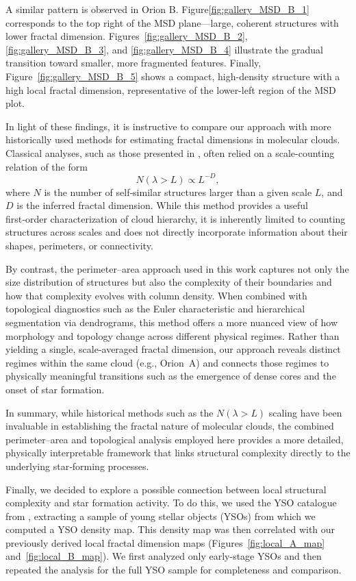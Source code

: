A similar pattern is observed in Orion B.
Figure\ref{fig:gallery_MSD_B_1} corresponds to the top right of the MSD plane—large, coherent structures with lower fractal dimension.
Figures~\ref{fig:gallery_MSD_B_2}, \ref{fig:gallery_MSD_B_3}, and \ref{fig:gallery_MSD_B_4} illustrate the gradual transition toward smaller, more fragmented features.
Finally, Figure~\ref{fig:gallery_MSD_B_5} shows a compact, high-density structure with a high local fractal dimension, representative of the lower-left region of the MSD plot.

In light of these findings, it is instructive to compare our approach with more historically used methods for estimating fractal dimensions in molecular clouds.  
Classical analyses, such as those presented in \cite{elmegreen1996fractal}, often relied on a scale-counting relation of the form
\[
N(\lambda > L) \propto L^{-D},
\]
where \(N\) is the number of self‑similar structures larger than a given scale \(L\), and \(D\) is the inferred fractal dimension.  
While this method provides a useful first‑order characterization of cloud hierarchy, it is inherently limited to counting structures across scales and does not directly incorporate information about their shapes, perimeters, or connectivity.

By contrast, the perimeter–area approach used in this work captures not only the size distribution of structures but also the complexity of their boundaries and how that complexity evolves with column density.  
When combined with topological diagnostics such as the Euler characteristic and hierarchical segmentation via dendrograms, this method offers a more nuanced view of how morphology and topology change across different physical regimes.  
Rather than yielding a single, scale‑averaged fractal dimension, our approach reveals distinct regimes within the same cloud (e.g., Orion~A) and connects those regimes to physically meaningful transitions such as the emergence of dense cores and the onset of star formation.

In summary, while historical methods such as the \( N(\lambda > L) \) scaling have been invaluable in establishing the fractal nature of molecular clouds, the combined perimeter–area and topological analysis employed here provides a more detailed, physically interpretable framework that links structural complexity directly to the underlying star‑forming processes.

Finally, we decided to explore a possible connection between local structural complexity and star formation activity. To do this, we used the YSO catalogue from \cite{megeath2012catalogue}, extracting a sample of young stellar objects (YSOs) from which we computed a YSO density map. This density map was then correlated with our previously derived local fractal dimension maps (Figures~\ref{fig:local_A_map} and~\ref{fig:local_B_map}). We first analyzed only early-stage YSOs and then repeated the analysis for the full YSO sample for completeness and comparison.

